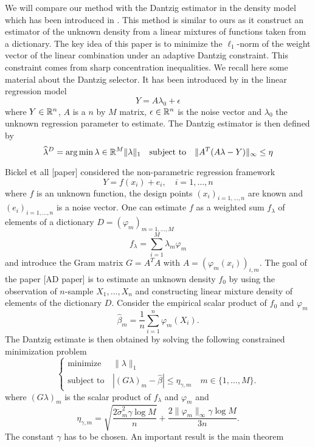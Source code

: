 We will compare our method with the Dantzig estimator in the density model which has been introduced in \cite{Bertin}. This method is similar to ours as it construct an estimator of the unknown density from a linear mixtures of functions taken from a dictionary. The key idea of this paper is to minimize the $\ell_1$-norm of the weight vector of the linear combination under an adaptive Dantzig constraint. This constraint comes from sharp concentration inequalities. We recall here some material about the Dantzig selector. It has been introduced by \cite{candes2007} in the linear regression model
\begin{equation}
	Y = A\lambda_0 + \epsilon
\end{equation}
where $Y\in {\mathbb R}^n$, $A$ is a $n$ by $M$ matrix, $\epsilon \in {\mathbb R}^n$ is the noise vector and $\lambda_0$ the unknown regression parameter to estimate. The Dantzig estimator is then defined by
\begin{equation}
	\widehat\lambda^D = \operatorname*{arg\,min}{\lambda \in {\mathbb R}^M} \|\lambda \|_1 \quad \text{subject to} \quad \| A^T(A\lambda-Y)\|_{\infty} \leq \eta
\end{equation}

Bickel et all [paper] considered the non-parametric regression framework
\begin{equation}
		Y = f(x_i) + e_i, \quad i=1,\dots,n
\end{equation}
where $f$ is an unknown function, the design points $(x_i)_{i=1,\dots,n}$ are known and $(e_i)_{i=1,\dots,n}$ is a noise vector. One can estimate $f$ as a weighted sum $f_{\lambda}$ of elements of a dictionary $D=(\varphi_m)_{m=1,\dots,M}$
\begin{equation}
	f_{\lambda} = \sum_{i=1}^M\lambda_m\varphi_m
\end{equation}
and introduce the Gram matrix $G=A^TA$ with $A=(\varphi_m(x_i))_{i,m}$. The goal of the paper [AD paper] is to estimate an unknown density $f_0$ by using the observation of $n$-sample $X_1,\dots,X_n$ and constructing linear mixture density of elements of the dictionary $D$. Consider the empirical scalar product of $f_0$ and $\varphi_m$
\begin{equation}
    \hat\beta_m = \frac{1}{n}\sum_{i=1}^n\varphi_m(X_i).
\end{equation}
The Dantzig estimate is then obtained by solving the following constrained minimization problem
\begin{equation*}
    \left\{
    \begin{array}{ll}
        \text{minimize}\, &\|\lambda\|_1 \\
        \text{subject to}\, &|(G\lambda)_m-\hat\beta|\leq \eta_{\gamma,m} \quad m\in \{1,\dots,M\}. 
    \end{array} \right.
\end{equation*}
where $(G\lambda)_m$ is the scalar product of $f_{\lambda}$ and $\varphi_m$ and 
\begin{equation}
    \eta_{\gamma,m} = \sqrt{\frac{2\tilde\sigma_m^2\gamma\log{M}}{n}}+ \frac{2\|\varphi_m\|_{\infty}\gamma\log{M}}{3n}.
\end{equation}
The constant $\gamma$ has to be chosen.
An important result is the main theorem

